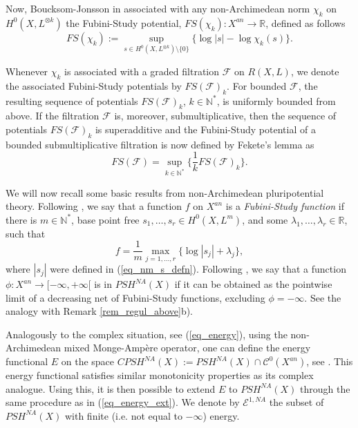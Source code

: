 \documentclass[12pt]{article}
\numberwithin{equation}{section}
\theoremstyle{theorem}
\theoremstyle{definition}
\theoremstyle{remark}
\newcommand{\real}{\mathbb{R}}
\newcommand{\nat}{\mathbb{N}}
\newcommand{\ccal}{\mathscr{C}}
\begin{document}
	\par 
	Now, Boucksom-Jonsson in \cite[(4.3)]{BouckJohn21} associated with any non-Archimedean norm $\chi_k$ on $H^0(X, L^{\otimes k})$ the Fubini-Study potential, $FS(\chi_k) : X^{an} \to \real$, defined as follows
	\begin{equation}\label{eq_fs_fin_ord}
		FS(\chi_k) := \sup_{s \in H^0(X, L^{\otimes k}) \setminus \{0\} } \big\{ \log |s| - \log \chi_{k}(s) \big\}.
	\end{equation}
	\par 
	Whenever $\chi_k$ is associated with a graded filtration $\mathcal{F}$ on $R(X, L)$, we denote the associated Fubini-Study potentials by $FS(\mathcal{F})_{k}$.
	For bounded $\mathcal{F}$, the resulting sequence of potentials $FS(\mathcal{F})_{k}$, $k \in \nat^*$, is uniformly bounded from above.
	If the filtration $\mathcal{F}$ is, moreover, submultiplicative, then the sequence of potentials $FS(\mathcal{F})_{k}$ is superadditive and the Fubini-Study potential of a bounded submultiplicative filtration is now defined by Fekete's lemma as 
	\begin{equation}\label{eq_na_fs_defn}
		FS(\mathcal{F}) = \sup_{k \in \nat^*} \Big\{ \frac{1}{k} FS(\mathcal{F})_{k} \Big\}.
	\end{equation}
	\par 
	\begin{sloppypar}
	We will now recall some basic results from non-Archimedean pluripotential theory.
	Following \cite[\S 1.8]{BouckJohn21}, we say that a function $f$ on $X^{an}$ is a \textit{Fubini-Study function} if there is $m \in \nat^*$, base point free $s_1, \ldots, s_r \in H^0(X, L^m)$, and some $\lambda_1, \ldots, \lambda_r \in \real$, such that 
	\begin{equation}
		f = \frac{1}{m} \max_{j = 1, \ldots, r} \{ 
			\log |s_j| + \lambda_j
		\},
	\end{equation}
	where $|s_j|$ were defined in (\ref{eq_nm_s_defn}).
	Following \cite[\S 6.2, 6.3]{BerBouckJonYTD}, we say that a function $\phi : X^{an} \to [-\infty, +\infty[$ is in $PSH^{NA}(X)$ if it can be obtained as the pointwise limit of a decreasing net of Fubini-Study functions, excluding $\phi = -\infty$.
	See the analogy with Remark \ref{rem_regul_above}b).
	\par 
	Analogously to the complex situation, see  (\ref{eq_energy}), using the non-Archimedean mixed Monge-Ampère operator, one can define the energy functional $E$ on the space $CPSH^{NA}(X) := PSH^{NA}(X) \cap \ccal^0(X^{an})$, see \cite[(4.3)]{BouckJohn21}.
	This energy functional satisfies similar monotonicity properties as its complex analogue.
	Using this, it is then possible to extend $E$ to $PSH^{NA}(X)$ through the same procedure as in (\ref{eq_energy_ext}).
	We denote by $\mathcal{E}^{1, NA}$ the subset of $PSH^{NA}(X)$ with finite (i.e. not equal to $- \infty$) energy.	
	\end{sloppypar}
\end{document}

